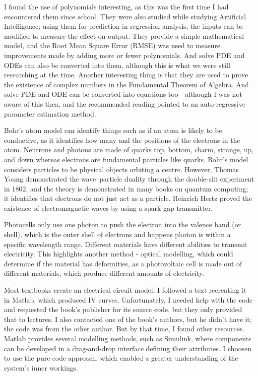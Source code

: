\documentclass{article}
\begin{document}
I found the use of polynomials interesting, as this was the first time I had encountered them since school. They were also studied while studying Artificial Intelligence; using them for prediction in regression analysis, the inputs can be modified to measure the effect on output. They provide a simple mathematical model, and the Root Mean Square Error (RMSE) was used to measure improvements made by adding more or fewer polynomials. And solve PDE and ODEs can also be converted into them, although this is what we were still researching at the time. Another interesting thing is that they are used to prove the existence of complex numbers in the Fundamental Theorem of Algebra. And solve PDE and ODE can be converted into equations too - although I was not aware of this then, and the recommended reading pointed to an auto-regressive parameter estimation method.

Bohr's atom model can identify things such as if an atom is likely to be conductive, as it identifies how many and the positions of the electrons in the atom. Neutrons and photons are made of quarks top, bottom, charm, strange, up, and down whereas electrons are fundamental particles like quarks. Bohr's model considers particles to be physical objects orbiting a centre. However, Thomas Young demonstrated the wave–particle duality through the double‐slit experiment in 1802, and the theory is demonstrated in many books on quantum computing; it identifies that electrons do not just act as a particle. Heinrich Hertz proved the existence of electromagnetic waves by using a spark gap transmitter. 

Photocells only use one photon to push the electron into the valence band (or shell), which is the outer shell of electrons and happens photon is within a specific wavelength range. Different materials have different abilities to transmit electricity. This highlights another method - optical modelling, which could determine if the material has deformities, as a photovoltaic cell is made out of different materials, which produce different amounts of electricity. 

Most textbooks create an electrical circuit model; I followed a text recreating it in Matlab, which produced IV curves. Unfortunately, I needed help with the code and requested the book's publisher for its source code, but they only provided that to lectures. I also contacted one of the book's authors, but he didn't have it; the code was from the other author. But by that time, I found other resources. Matlab provides several modelling methods, such as Simulink, where components can be developed in a drag-and-drop interface defining their attributes. I choosen to use the pure code approach, which enabled a greater understanding of the system's inner workings. 
\end{document}
